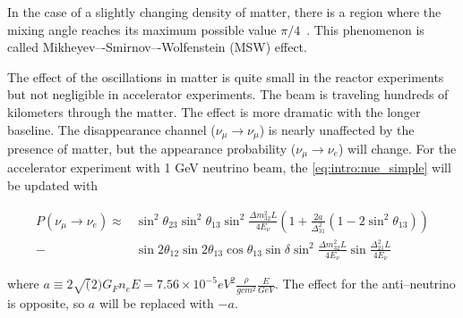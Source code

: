 \documentclass[../main.tex]{subfiles}
\begin{document}
In the case of a slightly changing density of matter, there is a region where the mixing angle reaches its maximum possible value $\pi/4$~\cite{Mikheyev1985}. This phenomenon is called Mikheyev–-Smirnov–-Wolfenstein (MSW) effect.

The effect of the oscillations in matter is quite small in the reactor experiments but not negligible in accelerator experiments. The beam is traveling hundreds of kilometers through the matter. The effect is more dramatic with the longer baseline. The disappearance channel ($\nu_\mu\to\nu_\mu$) is nearly unaffected by the presence of matter, but the appearance probability  ($\nu_\mu\to\nu_e$) will change. For the accelerator experiment with 1 GeV neutrino beam, the \autoref{eq:intro:nue_simple} will be updated with

\begin{align}
P\left(\nu_\mu\to\nu_e\right)\approx&\sin^2\theta_{23}\sin^2\theta_{13}\sin^2\frac{\Delta m_{32}^2L}{4E_\nu}\left(1+\frac{2a}{\Delta_{31}^2}\left(1-2\sin^2\theta_{13}\right)\right) \\
-&\sin2\theta_{12}\sin2\theta_{13}\cos\theta_{13}\sin\delta\sin^2\frac{\Delta m_{32}^2L}{4E_\nu}\sin\frac{\Delta_{21}^2L}{4E_\nu}
\end{align}

where $a\equiv2\sqrt(2)G_Fn_eE=7.56\times10^{-5}eV^2\frac{\rho}{gcm^2}\frac{E}{GeV}$. The effect for the anti--neutrino is opposite, so $a$ will be replaced with $-a$.
\end{document}
